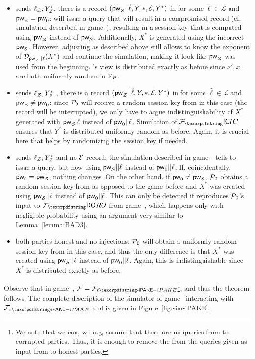 \begin{games}
\begin{itemize}
 \item \Env sends $\ell_\mathcal{Z},Y^*_\mathcal{Z}$, there is a record $(\mathsf{pw}_\mathcal{Z}||\hat\ell,Y,*,\mathcal{E},Y^*)$ in \ListIC for some $\hat\ell\in\mathcal{L}$ and $\mathsf{pw}_\mathcal{Z}=\mathsf{pw}_{0}$: \Sim will issue a \TestPwd query that will result in a compromised record (cf. simulation described in game~), resulting in a session key that is computed using $\mathsf{pw}_\mathcal{Z}$ instead of $\mathsf{pw}_\mathcal{S}$. Additionally, $X^*$ is generated using the incorrect \password $\mathsf{pw}_\mathcal{S}$. However, adjusting \ListIC as described above still allows \Sim to know the exponent of $\mathcal{D}_{\mathsf{pw}_\mathcal{Z}||\ell}(X^*)$ and continue the simulation, making it look like $\mathsf{pw}_\mathcal{Z}$ was used from the beginning. \Env's view is distributed exactly as before since $x',x$ are both uniformly random in $\mathbb{F}_P$.
 \item \Env sends $\ell_\mathcal{Z},Y^*_\mathcal{Z}$ , there is a record $(\mathsf{pw}_\mathcal{Z}||\hat\ell,Y,*,\mathcal{E},Y^*)$ in \ListIC for some $\hat\ell\in\mathcal{L}$ and $\mathsf{pw}_\mathcal{Z}\neq\mathsf{pw}_{0}$: since $\mathcal{P}_{0}$ will receive a random session key from \Func in this case (the record will be interrupted), we only have to argue indistinguishability of $X^*$ generated with $\mathsf{pw}_\mathcal{S}|\ell$ instead of $\mathsf{pw}_{0}||\ell$. Simulation of $\Fic$ ensures that $Y^*$ is distributed uniformly random as before. Again, it is crucial here that \Func helps \Sim by randomizing the session key if needed.
 \item \Env sends $\ell_\mathcal{Z},Y^*_\mathcal{Z}$ and no $\mathcal{E}$ record: the simulation described in game~~tells \Sim to issue a \TestPwd query, but now using $\mathsf{pw}_\mathcal{S}||\ell$ instead of $\mathsf{pw}_{0}||\ell$. If, coincidentally, $\mathsf{pw}_{0}=\mathsf{pw}_\mathcal{S}$, nothing changes. On the other hand, if $\mathsf{pw}_{0}\neq\mathsf{pw}_\mathcal{S}$, $\mathcal{P}_{0}$ obtains a random session key from \Func as opposed to the game before and $X^*$ was created using $\mathsf{pw}_\mathcal{S}||\ell$ instead of $\mathsf{pw}_{0}||\ell$. This can only be detected if \Env reproduces $\mathcal{P}_{0}$'s input to $\Fro$ from game~\previousgame, which happens only with negligible probability using an argument very similar to Lemma~\ref{lemma:BAD3}. 
 \item both parties honest and no injections: $\mathcal{P}_{0}$ will obtain a uniformly random session key from \Func in this case, and thus the only difference is that $X^*$ was created using $\mathsf{pw}_\mathcal{S}||\ell$ instead of $\mathsf{pw}_{0}||\ell$. Again, this is indistinguishable since $X^*$ is distributed exactly as before.
\end{itemize}
 
Observe that in game~, $\Func=\FliPAKE$\footnote{We note that we can, w.l.o.g, assume that there are no \NewSession queries from \Env to corrupted parties. Thus, it is enough to remove the \passwords from the \NewSession queries given as input from \Env to honest parties.}, and thus the theorem follows. The complete description of the simulator of game~ interacting with $\FliPAKE$ and \Env is given in Figure~\ref{fig:sim-iPAKE}.
\end{games}

